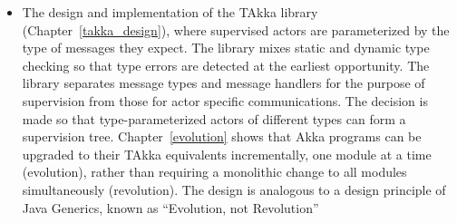 \begin{itemize}
\begin{comment}
  \item A formal model that captures the essence of the supervision principle.  
  The model (Chapter~\ref{supervision_model}) exhibits key features of the 
  supervision principle used in existing libraries including Erlang, Akka, and 
  TAkka. It provides a tool to compare the design alternatives of the 
  supervision principle.  
\end{comment}  
  \item The design and implementation of the TAkka library (Chapter~\ref{takka_design}), where supervised 
actors are parameterized by the type of messages they expect.  The library 
  mixes static and dynamic type checking so that type
  errors are detected at the earliest opportunity.  The library separates 
  message types and message handlers for the purpose of supervision from those 
  for actor specific communications.  The decision is made so that   
  type-parameterized actors of different types can form a supervision tree. 
  Chapter~\ref{evolution} shows that Akka 
  programs can be upgraded to their TAkka equivalents incrementally, one module 
  at a time (evolution), rather 
  than requiring a monolithic change to all modules simultaneously (revolution).  The
  design is analogous to a design principle of Java Generics, known as ``Evolution,
  not Revolution''


\end{itemize}
